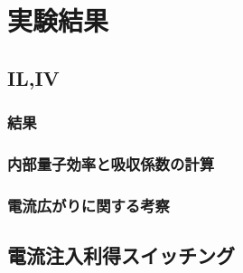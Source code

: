\chapter{実験結果}
\section{IL,IV}
\subsection{結果}
\subsection{内部量子効率と吸収係数の計算}
\subsection{電流広がりに関する考察}
\section{電流注入利得スイッチング}

